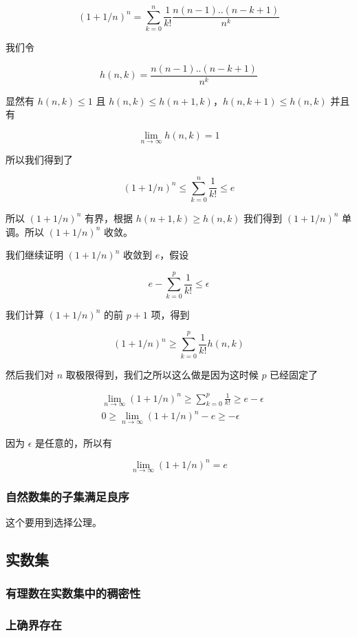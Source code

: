 \[
(1+1/n)^n = \sum_{k=0}^{n}\frac{1}{k!}\frac{n(n-1)..(n-k+1)}{n^k}
\]

我们令

\[
h(n,k) = \frac{n(n-1)..(n-k+1)}{n^k}
\]

显然有 $h(n,k) \le 1$ 且 $h(n,k) \le h(n+1,k)$，$h(n,k+1) \le h(n,k)$ 并且有

\[
\lim_{n \to \infty}h(n,k) = 1
\]

所以我们得到了 

\[
(1+1/n)^n \le \sum_{k=0}^{n}\frac{1}{k!} \le e
\]

所以 $(1+1/n)^n$ 有界，根据 $h(n+1,k) \ge h(n,k)$ 我们得到 $(1+1/n)^n$ 单调。所以 $(1+1/n)^n$ 收敛。

我们继续证明 $(1+1/n)^n$ 收敛到 $e$，假设

\[
e - \sum_{k=0}^{p}\frac{1}{k!} \le \epsilon
\]

我们计算 $(1+1/n)^n$ 的前 $p+1$ 项，得到

\[
(1+1/n)^n \ge \sum_{k=0}^{p}\frac{1}{k!}h(n,k)
\]

然后我们对 $n$ 取极限得到，我们之所以这么做是因为这时候 $p$ 已经固定了


\begin{align*}
& \lim_{n \to \infty}(1+1/n)^n \ge \sum_{k=0}^{p}\frac{1}{k!} \ge e - \epsilon \\
& 0 \ge \lim_{n \to \infty}(1+1/n)^n - e \ge -\epsilon 
\end{align*}

因为 $\epsilon$ 是任意的，所以有

\[
\lim_{n \to \infty}(1+1/n)^n = e
\]

\subsubsection{自然数集的子集满足良序}

这个要用到选择公理。

\subsection{实数集}


\subsubsection{有理数在实数集中的稠密性}

\subsubsection{上确界存在}

